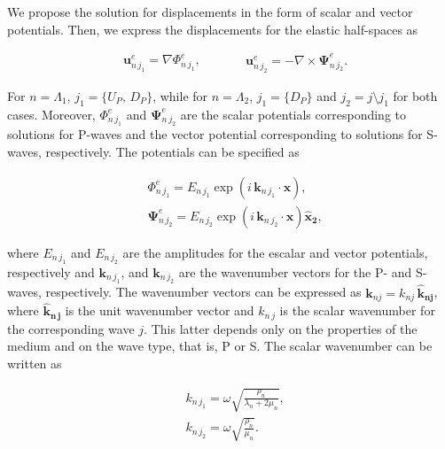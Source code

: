 \documentclass[draft]{agujournal2019}
\begin{document}
We propose the solution for displacements in the form of scalar and vector potentials. Then, we express the displacements for the elastic half-spaces as
\begin{linenomath*}
\begin{equation}\label{Eq.a9}
\begin{aligned}
& \bm{u}_{n\,j_1}^e = \nabla \Phi^e_{n\,j_1},
\end{aligned}
\qquad
\begin{aligned}
& \bm{u}_{n\,j_2}^e = -  \nabla  \times \bm{\Psi}^e_{n\,j_2}.
\end{aligned}
\end{equation}
\end{linenomath*}
For $n =\Lambda_1 $,  $j_1 = \{U_P,\,D_P\}$,  while for $n =\Lambda_2 $, $j_1 = \{D_P\}$ and $j_2=j \setminus j_1$ for both cases. Moreover, $\Phi^e_{n\,j_1}$ and $\bm{\Psi}^e_{n\,j_2}$ are the scalar potentials corresponding to solutions for P-waves and the vector potential corresponding to solutions for S-waves, respectively. The potentials can be specified as
\begin{linenomath*}
\begin{equation}\label{Eq.a10}
\begin{split}
&  \Phi^e_{n\,j_1} = E_{n\,j_1} \exp \left( i\, \bm{k}_{n\, j_1}\cdot \bm{x} \right), \\
& \bm{\Psi}^e_{n\,j_2} =  E_{n\,j_2} \exp \left( i\, \bm{k}_{n\, j_2} \cdot \bm{x} \right) \bm{\hat {x}_2}, 
\end{split}
\end{equation}
\end{linenomath*}
where $E_{n\,j_1}$ and $E_{n\,j_2}$ are the amplitudes for the escalar and vector potentials, respectively and $\bm{k}_{n \,j_1}$, and $\bm{k}_{n\, j_2}$ are the wavenumber vectors for the P- and S-waves, respectively. The wavenumber vectors can be expressed as $\bm{k}_{n j} = k_{nj} \, \bm{\hat {k}_{nj}}$, where $\bm{\hat {k}_{n\, j}}$ is the unit wavenumber vector and $k_{n\,j}$ is the scalar wavenumber for the corresponding wave $j$. This latter depends only on the properties of the medium and on the wave type, that is, P or S. The scalar wavenumber can be written as
\begin{linenomath*}
\begin{equation}\label{Eq.a11}
\begin{split}
& k_{n\,j_1}  = \omega \sqrt{\frac{\rho_n}{\lambda_n + 2 \mu_n}}, \\[10pt]
& k_{n\,j_2}  = \omega \sqrt{\frac{\rho_n}{ \mu_n}}.
\end{split}
\end{equation}
\end{linenomath*}
\end{document}
